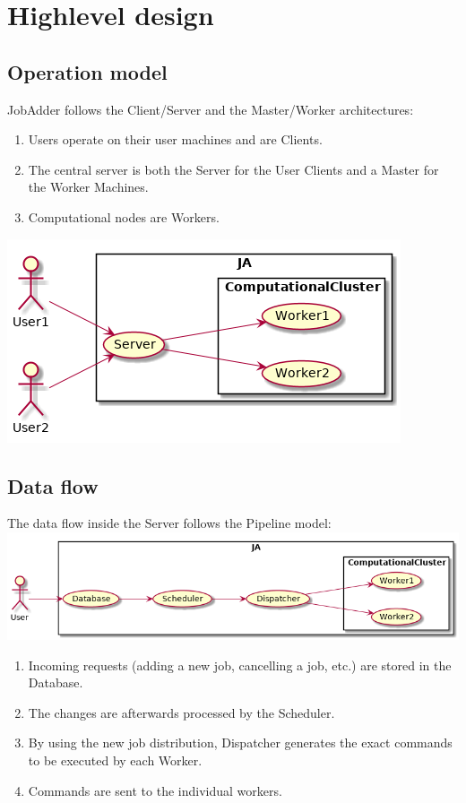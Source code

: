 \chapter{Highlevel design}
    \section{Operation model}
    JobAdder follows the Client/Server and the Master/Worker architectures:
    \linebreak
    \begin{minipage}[b]{0.5\linewidth}
        \begin{enumerate}
            \item Users operate on their user machines and are Clients.
            \item The central server is both the Server for the User Clients and a Master for the Worker Machines.
            \item Computational nodes are Workers.
        \end{enumerate}
    \end{minipage}
    \hfill
    \begin{minipage}[b]{0.35\linewidth}
        \includegraphics[height=8\baselineskip]{architecture/client-server-worker.png}
    \end{minipage}

    \section{Data flow}
    The data flow inside the Server follows the Pipeline model:
    \linebreak
    \includegraphics[width=\linewidth]{architecture/server-internal.png}
    \begin{enumerate}
        \item Incoming requests (adding a new job, cancelling a job, etc.) are stored in the Database.
        \item The changes are afterwards processed by the Scheduler.
        \item By using the new job distribution, Dispatcher generates the exact commands to be executed by each Worker.
        \item Commands are sent to the individual workers.
    \end{enumerate}
